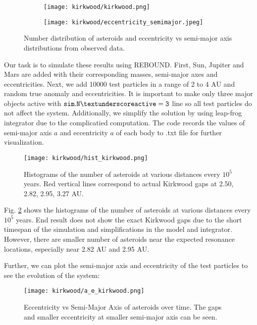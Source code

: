 \documentclass[12pt,a4paper]{article}
\begin{document}
\begin{figure}[H]
  \centering
  \begin{subfigure}{0.49\textwidth}
    \centering
    \texttt{[image: kirkwood/kirkwood.png]}
  \end{subfigure}
  \begin{subfigure}{0.49\textwidth}
    \centering
    \texttt{[image: kirkwood/eccentricity\_semimajor.jpeg]}
  \end{subfigure}
  \caption{Number distribution of asteroids and eccentricity vs semi-major axis distributions from observed data.}
  \label{fig:real_kirkwood}
\end{figure}

Our task is to simulate these results using REBOUND.
First, Sun, Jupiter and Mars are added with their corresponding masses, semi-major axes and eccentricities. 
Next, we add 10000 test particles in a range of 2 to 4 AU and random true anomaly and eccentricities. It is important to make only three major objects active with $\tt sim.N\textunderscore active=3$ line so all test particles do not affect the system. 
Additionally, we simplify the solution by using leap-frog integrator due to the complicatied computation. The code records the values of semi-major axis $a$ and eccentricity $a$ of each body to .txt file for further visualization.

\begin{figure}[ht]
  \centering
  \texttt{[image: kirkwood/hist\_kirkwood.png]}
  \caption{Histograms of the number of asteroids at various distances every $10^5$ years. Red vertical lines correspond to actual Kirkwood gaps at 2.50, 2.82, 2.95, 3.27 AU.}
  \label{fig:kirkwood_histogram}
\end{figure}

Fig. \ref{fig:kirkwood_histogram} shows the histograms of the number of asteroids at various distances every $10^5$ years.
End result does not show the exact Kirkwood gaps due to the short timespan of the simulation and simplifications in the model and integrator. However, there are smaller number of asteroids near the expected resonance locations, especially near 2.82 AU and 2.95 AU.

Further, we can plot the semi-major axis and eccentricity of the test particles to see the evolution of the system:

\begin{figure}[ht]
  \centering
  \texttt{[image: kirkwood/a\_e\_kirkwood.png]}
  \caption{Eccentricity vs Semi-Major Axis of asteroids over time. The gaps and smaller eccentricity at smaller semi-major axis can be seen.}
  \label{fig:kirkwood_a_e}
\end{figure}
\end{document}
